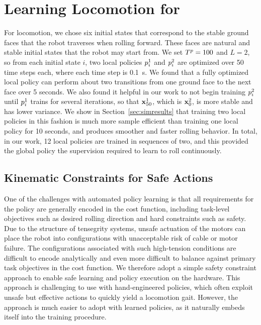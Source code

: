 \section{Learning Locomotion for \SB{}}
\label{sec:superball}

For \SB{} locomotion, we chose six initial states that correspond to the stable 
ground faces that the robot traverses when rolling forward. These faces are natural 
and stable initial states that the robot may start from. We set $T^{p}=100$ and
$L=2$, so from each initial state $i$, two local policies $p_i^1$ and
$p_i^2$ are optimized over 50 time steps each, where each time step is
\SI{0.1}{\second}. We found that a fully optimized local policy can perform
about two transitions from one ground face to the next face over 5 seconds. We
also found it helpful in our work to not begin training $p_i^2$ until
$p_i^1$ trains for several iterations, so that $\mathbf{x}_{50}^1$, which is
$\mathbf{x}_0^2$, is more stable and has lower variance.  We show in
Section~\ref{sec:simresults} that training two local policies in this fashion is
much more sample efficient than training one local policy for 10 seconds, and
produces smoother and faster rolling behavior. In total, in our work, 12 local
policies are trained in sequences of two, and this provided the global policy
the supervision required to learn to roll continuously.

\subsection{Kinematic Constraints for Safe Actions}

One of the challenges with automated policy learning is that all requirements
for the policy are generally encoded in the cost function, including task-level
objectives such as desired rolling direction and hard constraints such as
safety. Due to the structure of tensegrity systems, unsafe actuation of the
motors can place the robot into configurations with unacceptable risk of cable
or motor failure. The configurations associated with such high-tension
conditions are difficult to encode analytically and even more difficult to
balance against primary task objectives in the cost function. We therefore adopt
a simple safety constraint approach to enable safe learning and policy execution
on the \SB{} hardware. This approach is challenging to use with hand-engineered
policies, which often exploit unsafe but effective actions to quickly yield a
locomotion gait. However, the approach is much easier to adopt with learned
policies, as it naturally embeds itself into the training procedure.

